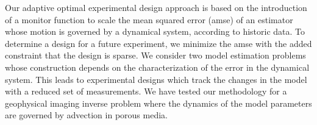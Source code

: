 \documentclass[11pt]{article}
\begin{document}
Our adaptive optimal experimental design approach is based on the introduction of a monitor function to scale the  mean squared error (amse) of an estimator whose motion is governed by a dynamical system, according to historic data. 
To determine a design for a future experiment, we minimize the amse  with the added constraint that the design is sparse. We consider two model estimation problems whose construction depends on the characterization of the error in the dynamical system. 
This leads to experimental designs which track the changes in the model with a reduced set of measurements.  
We have tested our methodology for a geophysical imaging inverse problem where the dynamics of the  model parameters are governed by advection in porous media. 

\bigskip

\newpage


%
\end{document}
